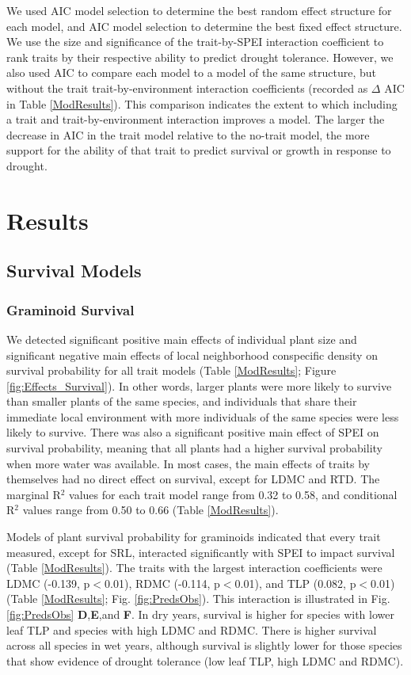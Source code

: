 \documentclass[12pt, letterpaper]{article}
\begin{document}
We used AIC model selection to determine the best random effect structure for each model, and AIC model selection to determine the best fixed effect structure. We use the size and significance of the trait-by-SPEI interaction coefficient to rank traits by their respective ability to predict drought tolerance. However, we also used AIC to compare each model to a model of the same structure, but without the trait  trait-by-environment interaction coefficients (recorded as $\Delta$ AIC in Table \ref{ModResults}). This comparison indicates the extent to which including a trait and trait-by-environment interaction improves a model. The larger the decrease in AIC in the trait model relative to the no-trait model, the more support for the ability of that trait to predict survival or growth in response to drought.

\section{Results}
\subsection{Survival Models} 
\subsubsection{Graminoid Survival}
We detected significant positive main effects of individual plant size and significant negative main effects of local neighborhood conspecific density on survival probability for all trait models (Table \ref{ModResults}; Figure \ref{fig:Effects_Survival}). In other words, larger plants were more likely to survive than smaller plants of the same species, and individuals that share their immediate local environment with more individuals of the same species were less likely to survive. There was also a significant positive main effect of SPEI on survival probability, meaning that all plants had a higher survival probability when more water was available. In most cases, the main effects of traits by themselves had no direct effect on survival, except for LDMC and RTD. The marginal R$^2$ values for each trait model range from 0.32 to 0.58, and conditional R$^2$ values range from 0.50 to 0.66 (Table \ref{ModResults}). 

Models of plant survival probability for graminoids indicated that every trait measured, except for SRL, interacted significantly with SPEI to impact survival (Table \ref{ModResults}). The traits with the largest interaction coefficients were LDMC (-0.139, p$<$0.01), RDMC (-0.114, p$<$0.01), and TLP (0.082, p$<$0.01)(Table \ref{ModResults}; Fig. \ref{fig:PredsObs}). This interaction is illustrated in Fig.\ref{fig:PredsObs} \textbf{D},\textbf{E},and \textbf{F}. In dry years, survival is higher for species with lower leaf TLP and species with high LDMC and RDMC. There is higher survival across all species in wet years, although survival is slightly lower for those species that show evidence of drought tolerance (low leaf TLP, high LDMC and RDMC). 
\end{document}
